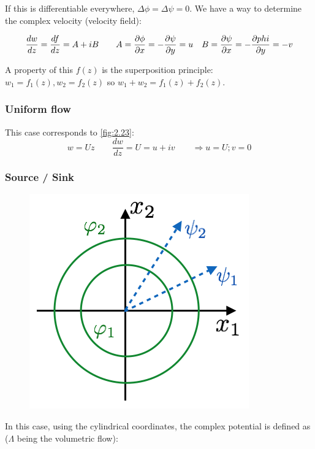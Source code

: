  		If this is differentiable everywhere, $\Delta \phi = \Delta \psi = 0$. We have a way to determine the complex velocity (velocity field):
 		
 		\begin{equation}
 		\frac{dw}{dz} = \frac{df}{dz} = A + iB \qquad A = \frac{\D \phi}{\D x} = - \frac{\D \psi}{\D y} = u \quad B = \frac{\D \psi}{\D x} = - \frac{\D phi}{\D y} = -v
 		\end{equation}
 		
 		A property of this $f(z)$ is the superposition principle: $w_1 = f_1(z), w_2 = f_2(z)$ so $w_1 + w_2 = f_1(z)+f_2(z)$.
 		
 	\subsubsection{Uniform flow}
 		This case corresponds to \autoref{fig:2.23}:
 		\begin{equation}
 		w = U z \qquad \frac{d w}{dz} = U = u+iv \qquad \Rightarrow u = U; v = 0
 		\end{equation}
 		
 	\subsubsection{Source / Sink}
 		\begin{figure}
		\vspace{-5mm}
		\includegraphics[scale=0.5]{ch2/25}
		\end{figure}
		In this case, using the cylindrical coordinates, the complex potential is defined as ($\Lambda$ being the volumetric flow): 
 		
